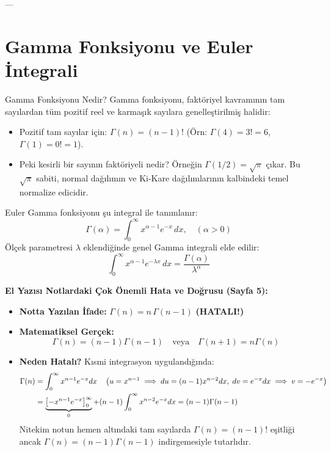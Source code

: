 \documentclass[12pt,a4paper]{article}
\begin{document}
---

\section{Gamma Fonksiyonu ve Euler İntegrali}

\begin{sezgi}{Gamma Fonksiyonu Nedir?}
Gamma fonksiyonu, faktöriyel kavramının tam sayılardan tüm pozitif reel ve karmaşık sayılara genelleştirilmiş halidir:
\begin{itemize}
    \item Pozitif tam sayılar için: $\Gamma(n) = (n-1)!$ (Örn: $\Gamma(4) = 3! = 6$, $\Gamma(1) = 0! = 1$).
    \item Peki kesirli bir sayının faktöriyeli nedir? Örneğin $\Gamma(1/2) = \sqrt{\pi}$ çıkar. Bu $\sqrt{\pi}$ sabiti, normal dağılımın ve Ki-Kare dağılımlarının kalbindeki temel normalize edicidir.
\end{itemize}
\end{sezgi}

Euler Gamma fonksiyonu şu integral ile tanımlanır:
\begin{equation}
    \Gamma(\alpha) = \int_{0}^{\infty} x^{\alpha - 1} e^{-x} \, dx, \quad (\alpha > 0)
\end{equation}
Ölçek parametresi $\lambda$ eklendiğinde genel Gamma integrali elde edilir:
\begin{equation}
    \int_{0}^{\infty} x^{\alpha - 1} e^{-\lambda x} \, dx = \frac{\Gamma(\alpha)}{\lambda^\alpha}
\end{equation}

\begin{uyari}
\textbf{El Yazısı Notlardaki Çok Önemli Hata ve Doğrusu (Sayfa 5):}
\begin{itemize}
    \item \textbf{Notta Yazılan İfade:} $\Gamma(n) = n \, \Gamma(n-1)$ \textbf{\textcolor{alertred}{(HATALI!)}}
    \item \textbf{Matematiksel Gerçek:} 
    \begin{equation}
        \boxed{\Gamma(n) = (n-1)\Gamma(n-1)} \quad \text{veya} \quad \boxed{\Gamma(n+1) = n\Gamma(n)}
    \end{equation}
    \item \textbf{Neden Hatalı?}  
    Kısmi integrasyon uygulandığında:
    \begin{align}
        \Gamma(n) &= \int_0^\infty x^{n-1} e^{-x} dx \quad \left(u = x^{n-1} \implies du = (n-1)x^{n-2}dx, \; dv = e^{-x}dx \implies v = -e^{-x}\right) \notag \\
        &= \underbrace{\left[ -x^{n-1} e^{-x} \right]_0^\infty}_{0} + (n-1) \int_0^\infty x^{n-2} e^{-x} dx = (n-1)\Gamma(n-1)
    \end{align}
    Nitekim notun hemen altındaki tam sayılarda $\Gamma(n) = (n-1)!$ eşitliği ancak $\Gamma(n) = (n-1)\Gamma(n-1)$ indirgemesiyle tutarlıdır.
\end{itemize}
\end{uyari}
\end{document}
